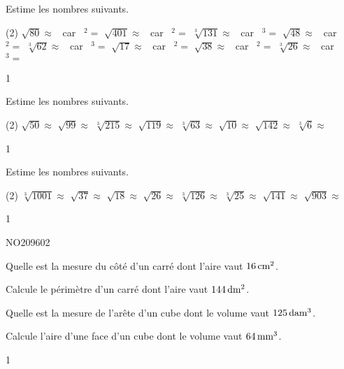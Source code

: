\documentclass[a4paper,11pt]{report}
\begin{document}
\begin{exop}{
    Estime les nombres suivants.
    \begin{tasks}(2)
        \task $\sqrt{80}\approx$ \hrulefill ~car~ \hrulefill$^2=$\hrulefill
        \task $\sqrt{401}\approx$ \hrulefill ~car~ \hrulefill$^2=$\hrulefill
        \task $\sqrt[3]{131}\approx$ \hrulefill ~car~ \hrulefill$^3=$\hrulefill
        \task $\sqrt{48}\approx$ \hrulefill ~car~ \hrulefill$^2=$\hrulefill
        \task $\sqrt[3]{62}\approx$ \hrulefill ~car~ \hrulefill$^3=$\hrulefill
        \task $\sqrt{17}\approx$ \hrulefill ~car~ \hrulefill$^2=$\hrulefill
        \task $\sqrt{38}\approx$ \hrulefill ~car~ \hrulefill$^2=$\hrulefill
        \task $\sqrt[3]{26}\approx$ \hrulefill ~car~ \hrulefill$^3=$\hrulefill
    \end{tasks}
}{1}
\end{exop}

\begin{exop}{
    Estime les nombres suivants.
    \begin{tasks}(2)
        \task $\sqrt{50}\approx$
        \task $\sqrt{99}\approx$
        \task $\sqrt[3]{215}\approx$
        \task $\sqrt{119}\approx$
        \task $\sqrt[3]{63}\approx$
        \task $\sqrt{10}\approx$
        \task $\sqrt{142}\approx$
        \task $\sqrt[3]{6}\approx$
    \end{tasks}
}{1}
\end{exop}

\begin{exop}{
    Estime les nombres suivants.
    \begin{tasks}(2)
        \task $\sqrt[3]{1001}\approx$
        \task $\sqrt{37}\approx$
        \task $\sqrt{18}\approx$
        \task $\sqrt{26}\approx$
        \task $\sqrt[3]{126}\approx$
        \task $\sqrt[3]{25}\approx$
        \task $\sqrt{141}\approx$
        \task $\sqrt{903}\approx$
    \end{tasks}
}{1}
\end{exop}

\begin{exof}{NO209}{60}{2} %
\end{exof}


\begin{exo}{
\begin{tasks}
    
\task Quelle est la mesure du côté d'un carré dont l'aire vaut $\tunit{16}{\centi m^2}$.

\task Calcule le périmètre d'un carré dont l'aire vaut $\tunit{144}{\deci m^2}$.

\task Quelle est la mesure de l'arête d'un cube dont le volume vaut $\tunit{125}{\deca m^3}$.

\task Calcule l'aire d'une face d'un cube dont le volume vaut $\tunit{64}{\milli m^3}$.
\end{tasks}
}{1}
\end{exo}
\end{document}
